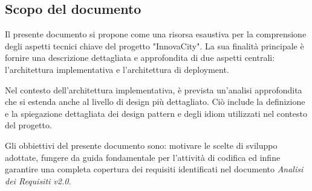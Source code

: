 \subsection{Scopo del documento}
Il presente documento si propone come una risorsa esaustiva per la comprensione degli aspetti tecnici chiave del progetto "InnovaCity". La sua finalità principale è fornire una descrizione dettagliata e approfondita di due aspetti centrali: l'architettura implementativa e l'architettura di deployment.

Nel contesto dell'architettura implementativa, è prevista un'analisi approfondita che si estenda anche al livello di design più dettagliato. Ciò include la definizione e la spiegazione dettagliata dei design pattern e degli idiom utilizzati nel contesto del progetto.

Gli obbiettivi del presente documento sono: motivare le scelte di sviluppo adottate, fungere da guida fondamentale per l'attività di codifica ed infine garantire una completa copertura dei requisiti identificati nel documento \textit{Analisi dei Requisiti v2.0}.


\begin{comment}
    Questo documento sarà impiegato dal gruppo ByteOps al fine di fornire un'esposizione dell'architettura del prodotto in fase di sviluppo, offrire informazioni per l'estensione del progetto e descrivere le procedure per l'installazione e lo sviluppo in ambiente locale. Nello specifico, la Specifica Tecnica comprende:
\begin{itemize}
    \item  \textbf{L'architettura logica del sistema:} una visione generale della struttura del sistema, identificando i suoi componenti principali e le relazioni tra di essi;
    \item  \textbf{Le tecnologie impiegate:}le tecnologie e le librerie di terze parti utilizzate per la realizzazione del sistema;
    \item  I pattern architetturali adottati e quelli influenzati dalle tecnologie impiegate;
    \item \textbf{Gli idiomi:} pattern di basso livello architetturale, convenzioni o tecniche specifiche utilizzate nel codice sorgente per affrontare determinati problemi o situazioni comuni durante lo sviluppo del software.
\end{itemize}
\end{comment}

